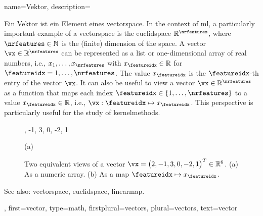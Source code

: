{name={Vektor},
	description={Ein  Vektor ist ein Element eines \gls{vectorspace}. 
		In the context of \gls{ml}, a particularly important example of a \gls{vectorspace} 
		is the \gls{euclidspace} $\mathbb{R}^{\nrfeatures}$, where $\nrfeatures \in \mathbb{N}$ 
		is the (finite) dimension of the space. A vector $\vx \in \mathbb{R}^{\nrfeatures}$ 
		can be represented as a list or one-dimensional array of real numbers, i.e., 
		$x_1, \ldots, x_{\nrfeatures}$ with $x_\featureidx \in \mathbb{R}$ for 
		$\featureidx = 1, \ldots, \nrfeatures$. The value $x_\featureidx$ is the $\featureidx$-th 
		entry of the vector $\vx$. It can also be useful to view a vector $\vx \in \mathbb{R}^{\nrfeatures}$ 
		as a \gls{function} that maps each index $\featureidx \in \{1, \ldots, \nrfeatures\}$ 
		to a value $x_\featureidx \in \mathbb{R}$, i.e., $\vx: \featureidx \mapsto x_\featureidx$. 
		This perspective is particularly useful for the study of \glspl{kernelmethod}.
		\begin{figure}[H]
			\begin{minipage}[c]{0.48\textwidth}
				, -1, 3, 0, -2, 1
				\begin{minipage}{\textwidth}
				\vspace{5ex}
				\centering
				{\selectfont (a)}
				\end{minipage}
			\end{minipage}
			\hfill
			\begin{minipage}{0.48\textwidth}
			\centering
			\end{minipage}
			\caption{Two equivalent views of a vector $\vx= \big( 2, -1, 3, 0, -2, 1 \big)^{T} \in \mathbb{R}^{6}$.
			(a) As a numeric array. (b) As a \gls{map} $\featureidx \mapsto x_\featureidx$.}
			\label{fig:vector-function-dual_dict}
		\end{figure}
		See also: \gls{vectorspace}, \gls{euclidspace}, \gls{linearmap}.},
	first={vector},
	type=math,
	firstplural={vectors},
	plural={vectors},
	text={vector}
}


